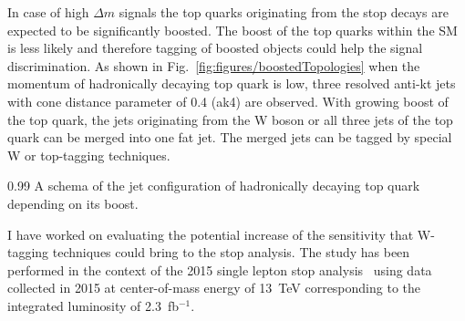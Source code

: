 In case of high  $\Delta m$ signals the top quarks originating from the stop decays are expected to be significantly boosted. The boost of the top quarks within the SM is less likely and therefore tagging of boosted objects could help the signal discrimination. As shown in Fig.~\ref{fig:figures/boostedTopologies} when the momentum of hadronically decaying top quark is low, three resolved anti-kt jets with cone distance parameter of 0.4 (ak4) are observed. With growing boost of the top quark, the jets originating from the W boson or all three jets of the top quark can be merged into one fat jet. The merged jets can be tagged by special W  or top-tagging techniques.

                 {0.99}       %
                 { A schema of the jet configuration of hadronically decaying top quark  depending on its boost. }


I have worked on evaluating the potential increase of the sensitivity that W-tagging techniques could bring to the stop analysis. The study has been performed in the context of the 2015 single lepton stop analysis~\cite{Sirunyan:2016jpr} using data collected in 2015 at center-of-mass energy of 13~TeV  corresponding to the integrated luminosity of 2.3~fb$^{-1}$. 


